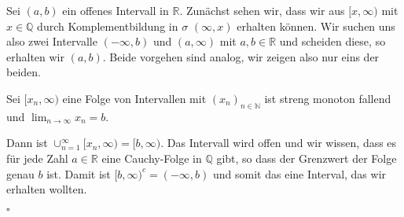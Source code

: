 \documentclass[11pt,a4paper,ngerman]{article}
\begin{document}
Sei $(a,b)$ ein offenes Intervall in $\mathbb{R}$. Zunächst sehen wir,
dass wir aus $[x, \infty)$ mit $x \in \mathbb{Q}$ durch Komplementbildung in $\sigma$ $(\infty, x)$ erhalten können.
Wir suchen uns also zwei Intervalle $(-\infty, b)$ und $(a, \infty)$ mit $a,b \in \mathbb{R}$ und scheiden diese, so erhalten wir $(a,b)$. Beide vorgehen sind
analog, wir zeigen also nur eins der beiden.


Sei $[x_n, \infty)$ eine Folge von Intervallen mit $(x_n)_{n \in \mathbb{N}}$
ist streng monoton fallend und $\lim_{n\rightarrow\infty} x_n = b$.

Dann ist $\cup_{n=1}^\infty [x_n, \infty) = [b, \infty)$. Das Intervall wird
offen und wir wissen, dass es für jede Zahl $a \in \mathbb{R}$ eine Cauchy-Folge in $\mathbb{Q}$ gibt, so dass der Grenzwert der Folge genau $b$ ist.
Damit ist $[b, \infty)^c = (-\infty, b)$ und somit das eine Interval, das wir erhalten wollten.

\mbox{}\hfill$\square$

\label{LastPage}
\end{document}

